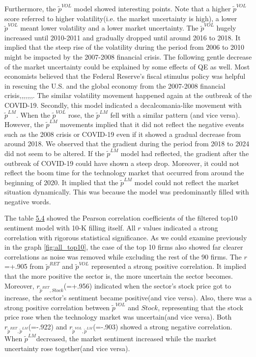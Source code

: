 \documentclass[logo,bsc,singlespacing,parskip]{infthesis}
\begin{document}
Furthermore, the $\tilde{p}^{VOL}$ model showed interesting points. Note that a higher $\tilde{p}^{VOL}$ score referred to higher volatility(i.e. the market uncertainty is high), a lower $\tilde{p}^{VOL}$ meant lower volatility and a lower market uncertainty. The $\tilde{p}^{VOL}$ hugely increased until 2010-2011 and gradually dropped until around 2016 to 2018. It implied that the steep rise of the volatility during the period from 2006 to 2010 might be impacted by the 2007-2008 financial crisis. The following gentle decrease of the market uncertainty could be explained by some effects of QE as well. Most economists believed that the Federal Reserve’s fiscal stimulus policy was helpful in rescuing the U.S. and the global economy from the 2007-2008 financial crisis,\cite{Gagnon2010},\cite{Chen2011},\cite{Stein2012},\cite{Gilchrist2013},\cite{Curdia2013},\cite{Wang2019},\cite{Luck2019}. The similar volatility movement happened again at the outbreak of the COVID-19.  Secondly, this model indicated a decalcomania-like movement with $\tilde{p}^{LM}$. When the $\tilde{p}^{VOL}$ rose, the $\tilde{p}^{LM}$ fell with a similar pattern (and vice versa). However, the $\tilde{p}^{LM}$ movements implied that it did not reflect the negative events such as the 2008 crisis or COVID-19 even if it showed a gradual decrease from around 2018. We observed that the gradient during the period from 2018 to 2024 did not seem to be altered. If the $\tilde{p}^{LM}$ model had reflected, the gradient after the outbreak of COVID-19 could have shown a steep drop. Moreover, it could not reflect the boom time for the technology market that occurred from around the beginning of 2020. It implied that the $\tilde{p}^{LM}$ model could not reflect the market situation dynamically. This was because the model was predominantly filled with negative words.

The table \hyperref[tab:all_top10_corr]{5.4} showed the Pearson correlation coefficients of the filtered top10 sentiment model with 10-K filling itself. All $r$ values indicated a strong correlation with rigorous statistical significance. As we could examine previously in the graph \ref{fig:all_top10}, the case of the top 10 firms also showed far clearer correlations as noise was removed while excluding the rest of the 90 firms. The $r$=+.905 from $\tilde{p}^{RET}$ and $\tilde{p}^{VOL}$ represented a strong positive correlation. It implied that the more positive the sector is, the more uncertain the sector becomes. Moreover, $r_{\tilde{p}^{RET}, Stock}$(=+.956) indicated when the sector’s stock price got to increase, the sector’s sentiment became positive(and vice versa). Also, there was a strong positive correlation between $\tilde{p}^{VOL}$ and $Stock$, representing that the stock price rose when the technology market was uncertain(and vice versa). Both $r_{\tilde{p}^{RET},\tilde{p}^{LM}}$(=-.922) and $r_{\tilde{p}^{VOL},\tilde{p}^{LM}}$(=-.903) showed a strong negative correlation. When $\tilde{p}^{LM}$decreased, the market sentiment increased while the market uncertainty rose together(and vice versa). 
\end{document}
